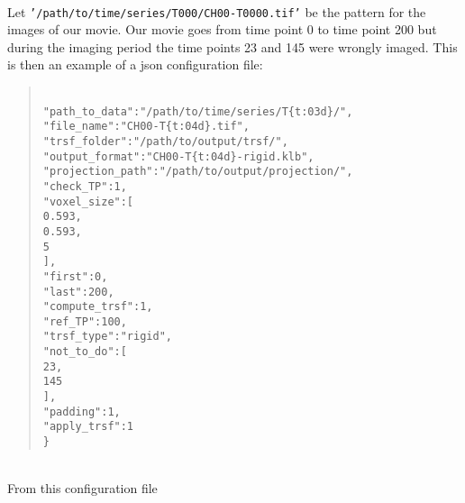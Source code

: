 \documentclass[10pt,a4paper]{article}
\newcommand{\option}[1]{{\texttt{'#1'}}}
\newcommand\tab[1][.6cm]{\hspace*{#1}}
\newenvironment{code}[1]{\mbox{}\\[1ex]\hspace*{-#1cm}\begin{minipage}{150mm}\begin{quote}\tt}{\end{quote}\end{minipage}\mbox{}\\[1ex]}
\begin{document}
\paragraph{}Let \option{/path/to/time/series/T000/CH00-T0000.tif} be the pattern for the images of our movie. Our movie goes from time point 0 to time point 200 but during the imaging period the time points 23 and 145 were wrongly imaged. This is then an example of a json configuration file:
\begin{code}{0.8}
\{\\
\tab"path\_to\_data":"/path/to/time/series/T\{t:03d\}/",\\
\tab"file\_name":"CH00-T\{t:04d\}.tif",\\
\tab"trsf\_folder":"/path/to/output/trsf/",\\
\tab"output\_format":"CH00-T\{t:04d\}-rigid.klb",\\
\tab"projection\_path":"/path/to/output/projection/",\\
\tab"check\_TP":1,\\
\tab"voxel\_size":[\\
\tab\tab0.593,\\
\tab\tab0.593,\\
\tab\tab5\\
\tab],\\
\tab"first":0,\\
\tab"last":200,\\
\tab"compute\_trsf":1,\\
\tab"ref\_TP":100,\\
\tab"trsf\_type":"rigid",\\
\tab"not\_to\_do":[\\
\tab\tab23,\\
\tab\tab145\\
\tab],\\
\tab"padding":1,\\
\tab"apply\_trsf":1\\
\}
\end{code}
From this configuration file 


\end{document}
